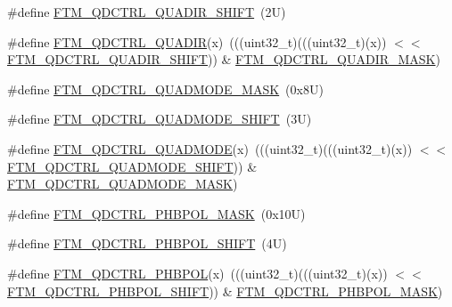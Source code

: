 \begin{DoxyCompactItemize}
\#define \mbox{\hyperlink{group___f_t_m___register___masks_ga31c6ba1b172d97e71ecd42ce6a8978ed}{F\+T\+M\+\_\+\+Q\+D\+C\+T\+R\+L\+\_\+\+Q\+U\+A\+D\+I\+R\+\_\+\+S\+H\+I\+FT}}~(2\+U)
\item 
\#define \mbox{\hyperlink{group___f_t_m___register___masks_gaaf4c9fe454a99d47b615ebd48c534d5e}{F\+T\+M\+\_\+\+Q\+D\+C\+T\+R\+L\+\_\+\+Q\+U\+A\+D\+IR}}(x)~(((uint32\+\_\+t)(((uint32\+\_\+t)(x)) $<$$<$ \mbox{\hyperlink{group___f_t_m___register___masks_ga31c6ba1b172d97e71ecd42ce6a8978ed}{F\+T\+M\+\_\+\+Q\+D\+C\+T\+R\+L\+\_\+\+Q\+U\+A\+D\+I\+R\+\_\+\+S\+H\+I\+FT}})) \& \mbox{\hyperlink{group___f_t_m___register___masks_gac6c87f5278eaf7f6c4121ec5a3b316a5}{F\+T\+M\+\_\+\+Q\+D\+C\+T\+R\+L\+\_\+\+Q\+U\+A\+D\+I\+R\+\_\+\+M\+A\+SK}})
\item 
\#define \mbox{\hyperlink{group___f_t_m___register___masks_gaaee693e052290f94ba226027a39f3bbd}{F\+T\+M\+\_\+\+Q\+D\+C\+T\+R\+L\+\_\+\+Q\+U\+A\+D\+M\+O\+D\+E\+\_\+\+M\+A\+SK}}~(0x8\+U)
\item 
\#define \mbox{\hyperlink{group___f_t_m___register___masks_ga70e29e6856263443f9415464e8c88d35}{F\+T\+M\+\_\+\+Q\+D\+C\+T\+R\+L\+\_\+\+Q\+U\+A\+D\+M\+O\+D\+E\+\_\+\+S\+H\+I\+FT}}~(3\+U)
\item 
\#define \mbox{\hyperlink{group___f_t_m___register___masks_ga0abc036e51f9b62b3512a7a33ed69fe7}{F\+T\+M\+\_\+\+Q\+D\+C\+T\+R\+L\+\_\+\+Q\+U\+A\+D\+M\+O\+DE}}(x)~(((uint32\+\_\+t)(((uint32\+\_\+t)(x)) $<$$<$ \mbox{\hyperlink{group___f_t_m___register___masks_ga70e29e6856263443f9415464e8c88d35}{F\+T\+M\+\_\+\+Q\+D\+C\+T\+R\+L\+\_\+\+Q\+U\+A\+D\+M\+O\+D\+E\+\_\+\+S\+H\+I\+FT}})) \& \mbox{\hyperlink{group___f_t_m___register___masks_gaaee693e052290f94ba226027a39f3bbd}{F\+T\+M\+\_\+\+Q\+D\+C\+T\+R\+L\+\_\+\+Q\+U\+A\+D\+M\+O\+D\+E\+\_\+\+M\+A\+SK}})
\item 
\#define \mbox{\hyperlink{group___f_t_m___register___masks_ga58a390751189f10795710f0726e42685}{F\+T\+M\+\_\+\+Q\+D\+C\+T\+R\+L\+\_\+\+P\+H\+B\+P\+O\+L\+\_\+\+M\+A\+SK}}~(0x10\+U)
\item 
\#define \mbox{\hyperlink{group___f_t_m___register___masks_gafd01650a0aa5dc97f5a738b70654944e}{F\+T\+M\+\_\+\+Q\+D\+C\+T\+R\+L\+\_\+\+P\+H\+B\+P\+O\+L\+\_\+\+S\+H\+I\+FT}}~(4\+U)
\item 
\#define \mbox{\hyperlink{group___f_t_m___register___masks_ga2353eb99f10faed2a6fc26b0388826c4}{F\+T\+M\+\_\+\+Q\+D\+C\+T\+R\+L\+\_\+\+P\+H\+B\+P\+OL}}(x)~(((uint32\+\_\+t)(((uint32\+\_\+t)(x)) $<$$<$ \mbox{\hyperlink{group___f_t_m___register___masks_gafd01650a0aa5dc97f5a738b70654944e}{F\+T\+M\+\_\+\+Q\+D\+C\+T\+R\+L\+\_\+\+P\+H\+B\+P\+O\+L\+\_\+\+S\+H\+I\+FT}})) \& \mbox{\hyperlink{group___f_t_m___register___masks_ga58a390751189f10795710f0726e42685}{F\+T\+M\+\_\+\+Q\+D\+C\+T\+R\+L\+\_\+\+P\+H\+B\+P\+O\+L\+\_\+\+M\+A\+SK}})
$$
\end{DoxyCompactItemize}

